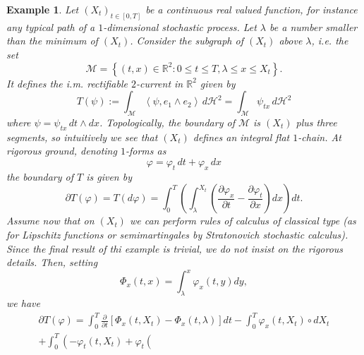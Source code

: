 \documentclass{article}
\newtheorem{example}[theorem]{Example}
\begin{document}
\begin{example}
Let $\left( X_{t}\right) _{t\in \left[ 0,T\right] }$ be a continuous real
valued function, for instance any typical path of a $1$-dimensional
stochastic process. Let $\lambda $ be a number smaller than the minimum of $%
\left( X_{t}\right) $. Consider the subgraph of $\left( X_{t}\right) $ above 
$\lambda $, i.e. the set 
\begin{equation*}
\mathcal{M}=\left\{ \left( t,x\right) \in \mathbb{R}^{2}:0\leq t\leq
T,\lambda \leq x\leq X_{t}\right\} .
\end{equation*}
It defines the i.m. rectifiable $2$-current in $\mathbb{R}^{2}$ given by 
\begin{equation*}
T\left( \psi \right) :=\int_{\mathcal{M}}\left\langle \psi ,e_{1}\wedge
e_{2}\right\rangle \,d\mathcal{H}^{2}=\int_{\mathcal{M}}\psi _{tx}\,d%
\mathcal{H}^{2}
\end{equation*}
where $\psi =\psi _{tx}\,dt\wedge dx$. Topologically, the boundary of $%
\mathcal{M}$ is $\left( X_{t}\right) $ plus three segments, so intuitively
we see that $\left( X_{t}\right) $ defines an integral flat $1$-chain. At
rigorous ground, denoting $1$-forms as 
\begin{equation*}
\varphi =\varphi _{t}\,dt+\varphi _{x}\,dx
\end{equation*}
the boundary of $T$ is given by 
\begin{equation*}
\partial T\left( \varphi \right) =T\left( d\varphi \right)
=\int_{0}^{T}\left( \int_{\lambda }^{X_{t}}\left( \frac{\partial \varphi
_{x}}{\partial t}-\frac{\partial \varphi _{t}}{\partial x}\right) dx\right)
dt.
\end{equation*}
Assume now that on $\left( X_{t}\right) $ we can perform rules of calculus
of classical type (as for Lipschitz functions or semimartingales by
Stratonovich stochastic calculus). Since the final result of thi example is
trivial, we do not insist on the rigorous details. Then, setting 
\begin{equation*}
\Phi _{x}\left( t,x\right) =\int_{\lambda }^{x}\varphi _{x}\left(
t,y\right) dy,
\end{equation*}
we have 
\begin{eqnarray*}
\partial T\left( \varphi \right) =\int_{0}^{T}\frac{\partial }{\partial t}%
\left[ \Phi _{x}\left( t,X_{t}\right) -\Phi _{x}\left( t,\lambda \right) %
\right] dt-\int_{0}^{T}\varphi _{x}\left( t,X_{t}\right) \circ dX_{t} \\
+\int_{0}^{T}\left( -\varphi _{t}\left( t,X_{t}\right) +\varphi _{t}\left(

\end{eqnarray*}
\end{example}
\end{document}
